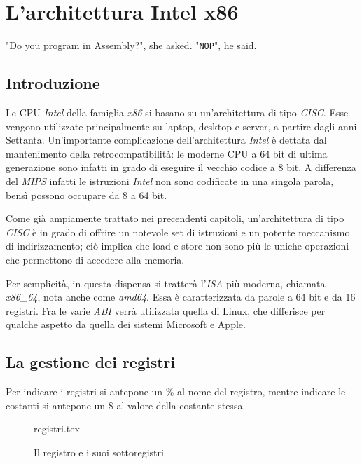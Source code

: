\documentclass[class=book, crop=false, oneside]{standalone}
\begin{document}
\chapter{L'architettura Intel x86}\begin{fquote}[Anonymous]"Do you program in Assembly?", she asked. "\texttt{NOP}", he said.
 \end{fquote}

\section{Introduzione}
Le CPU \emph{Intel} della famiglia \emph{x86} si basano su un'architettura di tipo \emph{CISC}. Esse vengono utilizzate principalmente su laptop, desktop e server, a partire dagli anni Settanta. Un'importante complicazione dell'architettura \emph{Intel} è dettata dal mantenimento della retrocompatibilità: le moderne CPU a 64 bit di ultima generazione sono infatti in grado di eseguire il vecchio codice a 8 bit. A differenza del \emph{MIPS} infatti le istruzioni \emph{Intel} non sono codificate in una singola parola, bensì possono occupare da 8 a 64 bit.

Come già ampiamente trattato nei precendenti capitoli, un'architettura di tipo \emph{CISC} è in grado di offrire un notevole set di istruzioni e un potente meccanismo di indirizzamento; ciò implica che load e store non sono più le uniche operazioni che permettono di accedere alla memoria.

Per semplicità, in questa dispensa si tratterà l'\emph{ISA} più moderna, chiamata \emph{x86\_64}, nota anche come \emph{amd64}. Essa è caratterizzata da parole a 64 bit e da 16 registri. Fra le varie \emph{ABI} verrà utilizzata quella di Linux, che differisce per qualche aspetto da quella dei sistemi Microsoft e Apple.

\section{La gestione dei registri}
Per indicare i registri si antepone un \% al nome del registro, mentre indicare le costanti si antepone un \$ al valore della costante stessa.

\begin{figure}[H]
	\centering
	{registri.tex}
	\caption{Il registro  e i suoi sottoregistri}
\end{figure}
\end{document}
